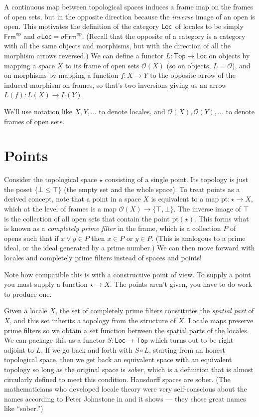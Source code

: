 \documentclass[14pt]{extarticle}
\newcommand{\op}[1]{#1^{\textsf{op}}}
\newcommand{\Frm}{\ensuremath{\mathsf{Frm}}}
\newcommand{\sFrm}{\ensuremath{\mathsf{\sigma Frm}}}
\newcommand{\Locale}{\ensuremath{\mathsf{Loc}}}
\newcommand{\Topcat}{\ensuremath{\mathsf{Top}}}
\newcommand{\slocale}{\ensuremath{\mathsf{\sigma Loc}}}
\renewcommand{\o}{\ensuremath{\mathcal{O}}}
\begin{document}
A continuous map between topological spaces induces a frame map on the frames of open sets, but in the opposite direction because the \emph{inverse} image of an open is open. This motivates the definition of the category \Locale\ of locales to be simply $\op{\Frm}$ and $\slocale=\op{\sFrm}$. (Recall that the opposite of a category is a category with all the same objects and morphisms, but with the direction of all the morphism arrows reversed.) We can define a functor $L:\Topcat\to\Locale$ on objects by mapping a space $X$ to its frame of open sets $\o(X)$ (so on objects, $L=\o$), and on morphisms by mapping a function $f:X\to Y$ to the opposite arrow of the induced morphism on frames, so that's two inversions giving us an arrow $L(f):L(X)\to L(Y)$.

We'll use notation like $X, Y, \ldots$ to denote locales, and $\o(X), \o(Y), \ldots$ to denote frames of open sets.

\section{Points}

Consider the topological space $\star$ consisting of a single point. Its topology is just the poset $\{\bot \leq \top\}$ (the empty set and the whole space). To treat points as a derived concept, note that a point in a space $X$ is equivalent to a map $\mathrm{pt}:\star\to X$, which at the level of frames is a map $\o(X)\to\{\top, \bot\}$. The inverse image of $\top$ is the collection of all open sets that contain the point $\mathrm{pt}(\star)$. This forms what is known as a \emph{completely prime filter} in the frame, which is a collection $P$ of opens such that if $x\vee y\in P$ then $x\in P$ or $y\in P$. (This is analogous to a prime ideal, or the ideal generated by a prime number.) We can then move forward with locales and completely prime filters instead of spaces and points!

Note how compatible this is with a constructive point of view. To supply a point you must supply a function $\star\to X$. The points aren't given, you have to do work to produce one.

Given a locale $X$, the set of completely prime filters constitutes the \emph{spatial part} of $X$, and this set inherits a topology from the structure of $X$. Locale maps preserve prime filters so we obtain a set function between the spatial parts of the locales. We can package this as a functor $S:\Locale\to\Topcat$ which turns out to be right adjoint to $L$. If we go back and forth with $S\circ L$, starting from an honest topological space, then we get back an equivalent space with an equivalent topology so long as the original space is \emph{sober}, which is a definition that is almost circularly defined to meet this condition. Hausdorff spaces are sober. (The mathematicians who developed locale theory were very self-conscious about the names according to Peter Johnstone in \cite{johnstone2} and it shows --- they chose great names like ``sober.'') 
\end{document}

